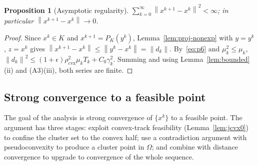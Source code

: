 \documentclass[]{interact}
\theoremstyle{plain}
\newtheorem{proposition}[theorem]{Proposition}
\theoremstyle{definition}
\theoremstyle{remark}
\newcommand{\norm}[1]{\left\lVert #1 \right\rVert}
\newcommand{\cvx}{\mathrm{cvx}}
\begin{document}
\begin{proposition}[Asymptotic regularity]\label{prop:regularity}
$\displaystyle\sum_{k=0}^\infty\norm{x^{k+1}-x^k}^2<\infty$; in particular
$\norm{x^{k+1}-x^k}\to0$.
\end{proposition}
\begin{proof}
Since $x^k\in K$ and $x^{k+1}=P_K(y^k)$, Lemma~\ref{lem:proj-nonexp} with $y=y^k$, $z=x^k$
gives $\norm{x^{k+1}-x^k}\le\norm{y^k-x^k}=\norm{d_k}$. By~\eqref{eq:p6} and
$\mu_k^2\le\mu_k$, $\norm{d_k}^2\le(1+\epsilon)\rho_{\cvx}^2\mu_k T_k+C_0\gamma_k^2$.
Summing and using Lemma~\ref{lem:bounded}(ii) and (A3)(iii), both series are finite.
\end{proof}

\subsection{Strong convergence to a feasible point}\label{ssec:strong}
The goal of the analysis is strong convergence of $\{x^k\}$ to a feasible point. The
argument has three stages: exploit convex-track feasibility (Lemma~\ref{lem:jcvx0}) to
confine the cluster set to the convex half; use a contradiction argument with
pseudoconvexity to produce a cluster point in $\Omega$; and combine with distance
convergence to upgrade to convergence of the whole sequence.
\end{document}
